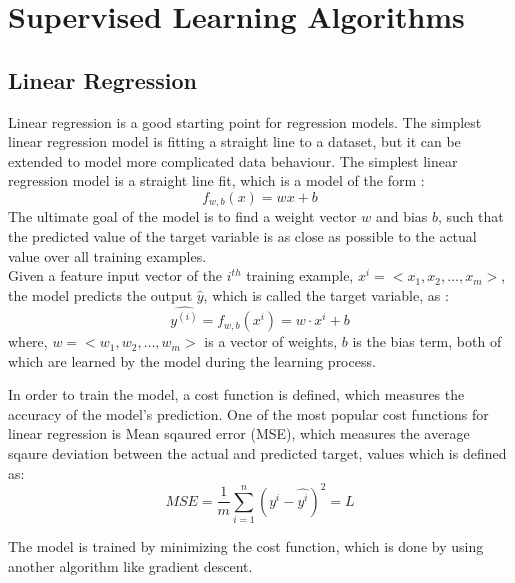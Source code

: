 \documentclass{article}
\begin{document}
\newpage
\section{Supervised Learning Algorithms}
\subsection{Linear Regression}
Linear regression is a good starting point for regression models. The simplest linear regression model is fitting a straight line to a dataset, but it can be extended to model more complicated data behaviour.
The simplest linear regression model is a straight line fit, which is a model of the form :
\begin{equation}
    f_{w,b}(x) = wx + b
\end{equation}
The ultimate goal of the model is to find a weight vector $w$ and bias $b$, such that the predicted value of the target variable is as close as possible to the actual value over all training examples.
\\Given a feature input vector of the $i^{th}$ training example, $x^{i} = <x_1,x_2,\dots,x_m>$, the model predicts the output $\hat{y}$, which is called the target variable, as :
\begin{equation}
    \hat{y^{(i)}} = f_{w,b}(x^{i}) = w \cdot x^{i} + b
\end{equation}
where, $w = <w_1,w_2,\dots,w_m>$ is a vector of weights, $b$ is the bias term, both of which are learned by the model during the learning process.

In order to train the model, a cost function is defined, which measures the accuracy of the model's prediction. One of the most popular cost functions for linear regression is Mean sqaured error (MSE), which measures the average sqaure deviation between the actual and predicted target, values which is defined as:
\begin{equation}
    MSE = \frac{1}{m} \sum_{i=1}^{n} (y^i - \hat{y^i})^2 = L
\end{equation}

The model is trained by minimizing the cost function, which is done by using another algorithm like gradient descent. 
\end{document}
